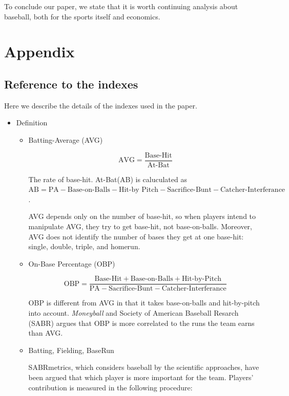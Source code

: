 \documentclass[dvipdfmx, 12pt]{article}
\begin{document}
To conclude our paper, we state that it is worth continuing analysis about baseball, both for the sports itself and economics.


\section{Appendix}

\subsection{Reference to the indexes}
\small

Here we describe the details of the indexes used in the paper.

\begin{itemize}
  \item Definition

  \begin{itemize}
    \item Batting-Average (AVG)

    \[
    \text{AVG} = \dfrac{\text{Base-Hit}}{\text{At-Bat}}
    \]

    The rate of base-hit. At-Bat(AB) is caluculated as $\text{AB} = \text{PA} - \text{Base-on-Balls} - \text{Hit-by Pitch} - \text{Sacrifice-Bunt} - \text{Catcher-Interferance}$.

    AVG depends only on the number of base-hit, so when players intend to manipulate AVG, they try to get base-hit, not base-on-balls. Moreover, AVG does not identify the number of bases they get at one base-hit: single, double, triple, and homerun.

    \item On-Base Percentage (OBP)

    \[
    \text{OBP} = \dfrac{\text{Base-Hit} + \text{Base-on-Balls} + \text{Hit-by-Pitch}}{\text{PA} - \text{Sacrifice-Bunt} - \text{Catcher-Interferance}}
    \]

    OBP is different from AVG in that it takes base-on-balls and hit-by-pitch into account. \textit{Moneyball} and Society of American Baseball Resarch (SABR) argues that OBP is more correlated to the runs the team earns than AVG.

    \item Batting, Fielding, BaseRun

    SABRmetrics, which considers baseball by the scientific approaches, have been argued that which player is more important for the team. Players' contribution is measured in the following procedure:


\end{itemize}
\end{itemize}
\end{document}
